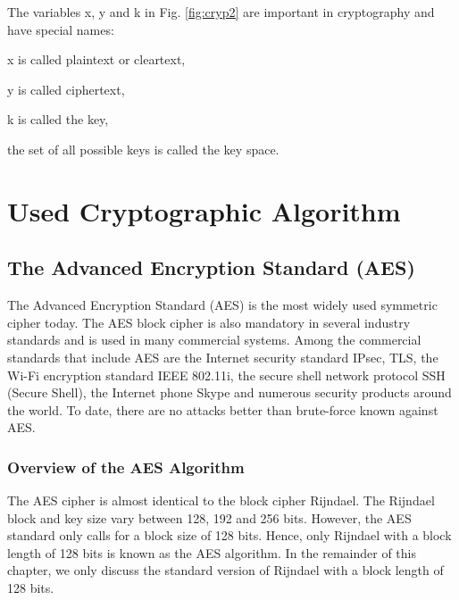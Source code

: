 \documentclass[../main.tex]{subfiles}
\begin{document}
The variables x, y and k in Fig. \ref{fig:cryp2} are important in cryptography and have special
names:

 x is called plaintext or cleartext,
 
 y is called ciphertext,
 
 k is called the key,
 
 the set of all possible keys is called the key space.

\section{Used Cryptographic Algorithm}

\subsection{The Advanced Encryption Standard (AES)}
The Advanced Encryption Standard (AES) is the most widely used symmetric cipher
today. The AES block cipher is also mandatory in several industry standards
and is used in many commercial systems. Among the commercial standards that
include AES are the Internet security standard IPsec, TLS, the Wi-Fi encryption
standard IEEE 802.11i, the secure shell network protocol SSH (Secure Shell), the
Internet phone Skype and numerous security products around the world. To date,
there are no attacks better than brute-force known against AES.\cite{10.5555/1721909}

\subsubsection{Overview of the AES Algorithm}

The AES cipher is almost identical to the block cipher Rijndael. The Rijndael block
and key size vary between 128, 192 and 256 bits. However, the AES standard only
calls for a block size of 128 bits. Hence, only Rijndael with a block length of 128
bits is known as the AES algorithm. In the remainder of this chapter, we only discuss
the standard version of Rijndael with a block length of 128 bits.\cite{10.5555/1721909}
\end{document}
